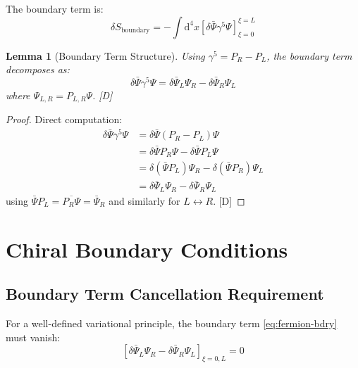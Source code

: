 \documentclass[11pt,a4paper]{article}
\newtheorem{lemma}[theorem]{Lemma}
\newcommand{\dd}{\mathrm{d}}
\begin{document}
The boundary term is:
\begin{equation}
\boxed{
\delta S_{\text{boundary}} = -\int \dd^4x \left[
\delta\bar{\Psi} \gamma^5 \Psi\right]_{\xi=0}^{\xi=L}
}
\label{eq:fermion-bdry}
\end{equation}

\begin{lemma}[Boundary Term Structure]
\label{lem:bdry-structure}
Using $\gamma^5 = P_R - P_L$, the boundary term decomposes as:
\begin{equation}
\delta\bar{\Psi}\gamma^5\Psi = \delta\bar{\Psi}_L \Psi_R - \delta\bar{\Psi}_R \Psi_L
\label{eq:bdry-decomp}
\end{equation}
where $\Psi_{L,R} = P_{L,R}\Psi$. [D]
\end{lemma}

\begin{proof}
Direct computation:
\begin{align}
\delta\bar{\Psi}\gamma^5\Psi &= \delta\bar{\Psi}(P_R - P_L)\Psi \\
&= \delta\bar{\Psi}P_R\Psi - \delta\bar{\Psi}P_L\Psi \\
&= \delta(\bar{\Psi}P_L)\Psi_R - \delta(\bar{\Psi}P_R)\Psi_L \\
&= \delta\bar{\Psi}_L \Psi_R - \delta\bar{\Psi}_R \Psi_L
\label{eq:bdry-proof}
\end{align}
using $\bar{\Psi}P_L = \overline{P_R\Psi} = \bar{\Psi}_R$ and similarly for $L \leftrightarrow R$. [D]
\end{proof}

\section{Chiral Boundary Conditions}
\label{sec:chiral-bc}

\subsection{Boundary Term Cancellation Requirement}

For a well-defined variational principle, the boundary term \eqref{eq:fermion-bdry} must vanish:
\begin{equation}
\left[\delta\bar{\Psi}_L \Psi_R - \delta\bar{\Psi}_R \Psi_L\right]_{\xi=0,L} = 0
\label{eq:bc-requirement}
\end{equation}
\end{document}
